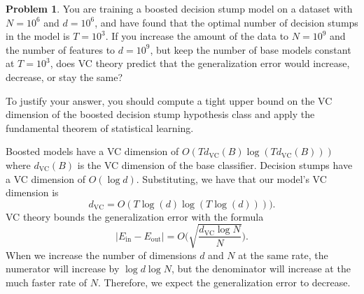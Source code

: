 \documentclass[10pt]{exam}
\theoremstyle{definition}
\newtheorem{problem}{Problem}
\newcommand{\Ein}{E_{\text{in}}}
\newcommand{\Eout}{E_{\text{out}}}
\newcommand{\dvc}{{d_{\text{VC}}}}
\begin{document}
\newpage
\begin{problem}
    You are training a boosted decision stump model on a dataset with $N=10^6$ and $d=10^6$,
    and have found that the optimal number of decision stumps in the model is $T=10^3$.
    If you increase the amount of the data to $N=10^9$ and the number of features to $d=10^9$, but keep the number of base models constant at $T=10^3$, does VC theory predict that the generalization error would increase, decrease, or stay the same?

    To justify your answer, you should compute a tight upper bound on the VC dimension of the boosted decision stump hypothesis class and apply the fundamental theorem of statistical learning.
\end{problem}
\begin{solution}
    Boosted models have a VC dimension of $O(T \dvc(B) \log (T \dvc(B)))$ where $\dvc(B)$ is the VC dimension of the base classifier.
    Decision stumps have a VC dimension of $O(\log d)$.
    Substituting, we have that our model's VC dimension is
    \begin{equation}
        \dvc = O(T \log(d) \log (T \log (d))))
        .
    \end{equation}
    VC theory bounds the generalization error with the formula
    \begin{equation}
        |\Ein-\Eout| = O\bigg(\sqrt{\frac{\dvc \log N}{N}}\bigg).
    \end{equation}
    When we increase the number of dimensions $d$ and $N$ at the same rate,
    the numerator will increase by $\log d \log N$, but the denominator will increase at the much faster rate of $N$.
    Therefore, we expect the generalization error to decrease.
\end{solution}
\end{document}
